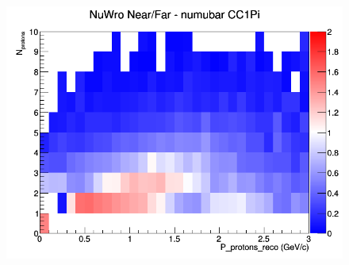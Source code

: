 \begin{figure}[h]
\endminipage
{}
\includegraphics[width=\linewidth]{eff_N_P/FGT/protons/ratios/CC1Pi_NuWro_numubar_NF_N_P.png}
\endminipage
\newline
\end{figure}
\clearpage
